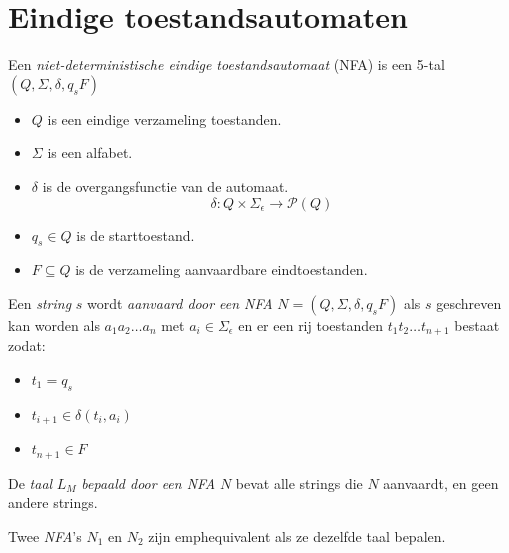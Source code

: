 \documentclass[main.tex]{subfiles}
\begin{document}
\section{Eindige toestandsautomaten}
\label{sec:eind-toest}

\begin{de}
  Een \emph{niet-deterministische eindige toestandsautomaat} (NFA) is een 5-tal $(Q,\Sigma,\delta,q_{s}F)$
  \begin{itemize}
  \item $Q$ is een eindige verzameling toestanden.
  \item $\Sigma$ is een alfabet.
  \item $\delta$ is de overgangsfunctie van de automaat.
  \[ \delta: Q \times \Sigma_{\epsilon} \rightarrow \mathcal{P}(Q) \]
  \item $q_{s} \in Q$ is de starttoestand.
  \item $F \subseteq Q$ is de verzameling aanvaardbare eindtoestanden.
  \end{itemize}
\end{de}

\begin{de}
  Een \emph{string} $s$ wordt \emph{aanvaard door een NFA} $N=(Q,\Sigma,\delta,q_{s}F)$ als $s$ geschreven kan worden als $a_{1}a_{2}\ldots a_{n}$ met $a_{i} \in \Sigma_{\epsilon}$ en er een rij toestanden $t_{1}t_{2}\ldots t_{n+1}$ bestaat zodat:
  \begin{itemize}
  \item $t_{1} = q_{s}$
  \item $t_{i+1} \in \delta(t_{i},a_{i})$
  \item $t_{n+1} \in F$
  \end{itemize}
\end{de}

\begin{de}
  De \emph{taal} $L_{M}$ \emph{bepaald door een NFA} $N$ bevat alle strings die $N$ aanvaardt, en geen andere strings.
\end{de}

\begin{de}
  Twee \emph{NFA}'s $N_{1}$ en $N_{2}$ zijn emph{equivalent} als ze dezelfde taal bepalen.
\end{de}
\end{document}
